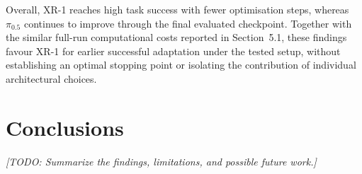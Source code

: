 \documentclass[10pt,twocolumn,letterpaper]{article}
\newcommand{\papertodo}[1]{\textit{[TODO: #1]}}
\begin{document}
Overall, XR-1 reaches high task success with fewer optimisation steps, whereas $\pi_{0.5}$ continues to improve through the final evaluated checkpoint. Together with the similar full-run computational costs reported in Section~5.1, these findings favour XR-1 for earlier successful adaptation under the tested setup, without establishing an optimal stopping point or isolating the contribution of individual architectural choices.

\section{Conclusions}
\papertodo{Summarize the findings, limitations, and possible future work.}

{\small


}
\end{document}

